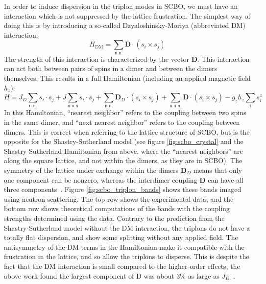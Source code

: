 \documentclass{thesis-umich}
\begin{document}
In order to induce dispersion in the triplon modes in SCBO, we must have an interaction which is not suppressed by the lattice frustration. The simplest way of doing this is by introducing a so-called Dzyaloshinsky-Moriya (abbreviated DM) interaction:
\[ H_{\mathrm{DM}} = \sum_{\mathrm{n.n.}} \mathbf{D} \cdot (s_i \times s_j) \]
The strength of this interaction is characterized by the vector $\mathbf{D}$. This interaction can act both between pairs of spins in a dimer and between the dimers themselves. This results in a full Hamiltonian (including an applied magnetic field $h_z$):
\[ H = J_D \sum_{\mathrm{n.n.}} s_i \cdot s_j + J \sum_{\mathrm{n.n.n}} s_i \cdot s_j + \sum_{\mathrm{n.n.}} \mathbf{D}_D \cdot (s_i \times s_j) + \sum_{\mathrm{n.n.n.}} \mathbf{D} \cdot (s_i \times s_j) - g_z h_z \sum_i s_i^z\]
In this Hamiltonian, ``nearest neighbor'' refers to the coupling between two spins in the same dimer, and ``next nearest neighbor'' refers to the coupling between dimers. This is correct when referring to the lattice structure of SCBO, but is the opposite for the Shastry-Sutherland model (see figure \ref{fig:scbo_crystal} and the Shastry-Sutherland Hamiltonian from above, where the ``nearest neighbors'' are along the square lattice, and not within the dimers, as they are in SCBO). The symmetry of the lattice under exchange within the dimers $\mathbf{D}_D$ means that only one component can be nonzero, whereas the interdimer coupling $\mathbf{D}$ can have all three components~\cite{McClarty2017}. Figure \ref{fig:scbo_triplon_bands} shows these bands imaged using neutron scattering. The top row shows the experimental data, and the bottom row shows theoretical computations of the bands with the coupling strengths determined using the data. Contrary to the prediction from the Shastry-Sutherland model without the DM interaction, the triplons do not have a totally flat dispersion, and show some splitting without any applied field. The antisymmetry of the DM terms in the Hamiltonian make it compatible with the frustration in the lattice, and so allow the triplons to disperse. This is despite the fact that the DM interaction is small compared to the higher-order effects, the above work found the largest component of $\mathrm{D}$ was about 3\% as large as $J_D$~\cite{McClarty2017}.
\end{document}
